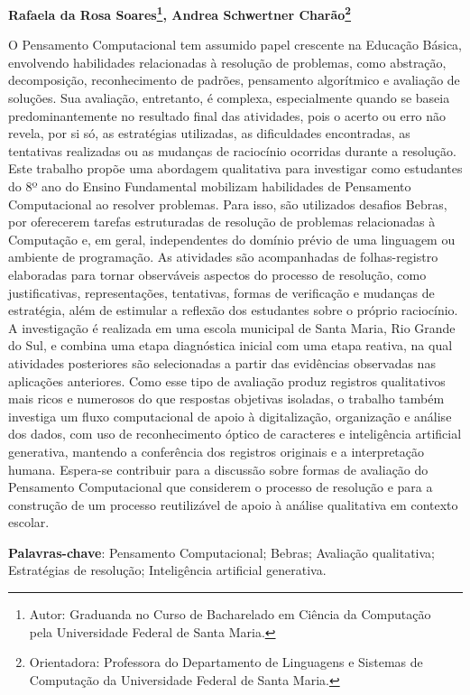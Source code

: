\documentclass[
	article,			%
	12pt,				%
	oneside,			%
	a4paper,			%
	chapter=TITLE,		%
	section=TITLE,		%
	english,			%
	brazil,				%
    sumario=tradicional
	]{abntex2}
\newcommand{\MyInstitution}{Universidade Federal de Santa Maria}
\newcommand{\MyCourse}{Curso de Bacharelado em Ciência da Computação}
\newcommand{\MyAuthor}{Rafaela da Rosa Soares}
\newcommand{\MyFootnote}{Autor: Graduanda no \MyCourse~ pela \MyInstitution.}
\newcommand{\MyAdvisorName}{Andrea Schwertner Charão}
\newcommand{\MyAdvisorFootnote}{Orientadora: Professora do Departamento de Linguagens e Sistemas de Computação da \MyInstitution.}
\renewcommand{\maketitle}{%
  \begin{center}
  {\textbf{\MakeUppercase\thetitle}}\par
  {\MakeUppercase\theforeigntitle}\par\vspace{0.5cm}
  
  \textbf{\MyAuthor\footnote{\MyFootnote}, 
  \MyAdvisorName\footnote{\MyAdvisorFootnote}}\par
  \end{center}
}
\begin{document}
\newpage

\maketitle





\begin{resumoumacoluna}
O Pensamento Computacional tem assumido papel crescente na Educação Básica, envolvendo habilidades relacionadas à resolução de problemas, como abstração, decomposição, reconhecimento de padrões, pensamento algorítmico e avaliação de soluções. Sua avaliação, entretanto, é complexa, especialmente quando se baseia predominantemente no resultado final das atividades, pois o acerto ou erro não revela, por si só, as estratégias utilizadas, as dificuldades encontradas, as tentativas realizadas ou as mudanças de raciocínio ocorridas durante a resolução. Este trabalho propõe uma abordagem qualitativa para investigar como estudantes do 8º ano do Ensino Fundamental mobilizam habilidades de Pensamento Computacional ao resolver problemas. Para isso, são utilizados desafios Bebras, por oferecerem tarefas estruturadas de resolução de problemas relacionadas à Computação e, em geral, independentes do domínio prévio de uma linguagem ou ambiente de programação. As atividades são acompanhadas de folhas-registro elaboradas para tornar observáveis aspectos do processo de resolução, como justificativas, representações, tentativas, formas de verificação e mudanças de estratégia, além de estimular a reflexão dos estudantes sobre o próprio raciocínio. A investigação é realizada em uma escola municipal de Santa Maria, Rio Grande do Sul, e combina uma etapa diagnóstica inicial com uma etapa reativa, na qual atividades posteriores são selecionadas a partir das evidências observadas nas aplicações anteriores. Como esse tipo de avaliação produz registros qualitativos mais ricos e numerosos do que respostas objetivas isoladas, o trabalho também investiga um fluxo computacional de apoio à digitalização, organização e análise dos dados, com uso de reconhecimento óptico de caracteres e inteligência artificial generativa, mantendo a conferência dos registros originais e a interpretação humana. Espera-se contribuir para a discussão sobre formas de avaliação do Pensamento Computacional que considerem o processo de resolução e para a construção de um processo reutilizável de apoio à análise qualitativa em contexto escolar.

 
 \noindent
 \textbf{Palavras-chave}: Pensamento Computacional; Bebras; Avaliação qualitativa; Estratégias de resolução; Inteligência artificial generativa.
 
\end{resumoumacoluna}
\end{document}
